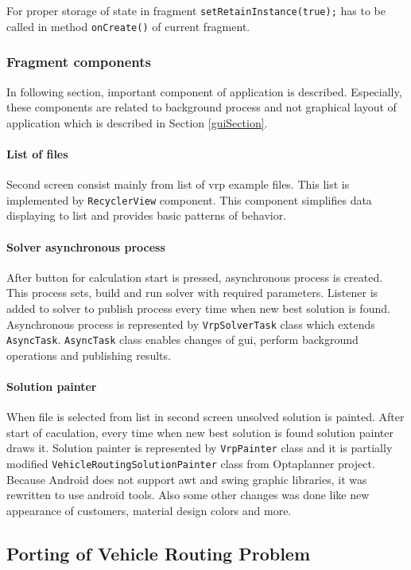 For proper storage of state in fragment \texttt{setRetainInstance(true);} has to be called in method \texttt{onCreate()}
of current fragment.

\subsubsection{Fragment components}
In following section, important component of application is described. Especially, these components are related to
background process and not graphical layout of application which is described in Section \ref{guiSection}.

\paragraph{List of files}
Second screen consist mainly from list of vrp example files. This list is implemented by \texttt{RecyclerView}
component. This component simplifies data displaying to list and provides basic patterns of behavior.

\paragraph{Solver asynchronous process}
After button for calculation start is pressed, asynchronous process is created. This process sets, build and run solver
with required parameters. Listener is added to solver to publish process every time when new best solution is found.
Asynchronous process is represented by \texttt{VrpSolverTask} class which extends \texttt{AsyncTask}. \texttt{AsyncTask}
class enables changes of gui, perform background operations and publishing results.

\paragraph{Solution painter}
When file is selected from list in second screen unsolved solution is painted. After start of caculation, every time
when new best solution is found solution painter draws it. Solution painter is represented by \texttt{VrpPainter} class
and it is partially modified \texttt{VehicleRoutingSolutionPainter} class from Optaplanner project. Because Android
does not support awt and swing graphic libraries, it was rewritten to use android tools. Also some other changes was
done like new appearance of customers, material design colors and more.

\subsection{Porting of Vehicle Routing Problem}

